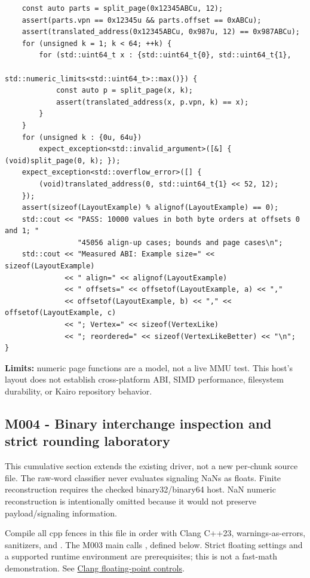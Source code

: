 \begin{verbatim}
    const auto parts = split_page(0x12345ABCu, 12);
    assert(parts.vpn == 0x12345u && parts.offset == 0xABCu);
    assert(translated_address(0x12345ABCu, 0x987u, 12) == 0x987ABCu);
    for (unsigned k = 1; k < 64; ++k) {
        for (std::uint64_t x : {std::uint64_t{0}, std::uint64_t{1},
                                std::numeric_limits<std::uint64_t>::max()}) {
            const auto p = split_page(x, k);
            assert(translated_address(x, p.vpn, k) == x);
        }
    }
    for (unsigned k : {0u, 64u})
        expect_exception<std::invalid_argument>([&] { (void)split_page(0, k); });
    expect_exception<std::overflow_error>([] {
        (void)translated_address(0, std::uint64_t{1} << 52, 12);
    });
    assert(sizeof(LayoutExample) % alignof(LayoutExample) == 0);
    std::cout << "PASS: 10000 values in both byte orders at offsets 0 and 1; "
                 "45056 align-up cases; bounds and page cases\n";
    std::cout << "Measured ABI: Example size=" << sizeof(LayoutExample)
              << " align=" << alignof(LayoutExample)
              << " offsets=" << offsetof(LayoutExample, a) << ","
              << offsetof(LayoutExample, b) << "," << offsetof(LayoutExample, c)
              << "; Vertex=" << sizeof(VertexLike)
              << "; reordered=" << sizeof(VertexLikeBetter) << "\n";
}
\end{verbatim}

\textbf{Limits:} numeric page functions are a model, not a live MMU test. This host's layout does not establish cross-platform ABI, SIMD performance, filesystem durability, or Kairo repository behavior.

\subsection{M004 - Binary interchange inspection and strict rounding laboratory}\label{appendix-4e2236f53445-m004---binary-interchange-inspection-and-strict-rounding-laboratory}

\hypertarget{appendix-4e2236f53445-m004---binary-interchange-inspection-and-strict-rounding-laboratory}{}

This cumulative section extends the existing driver, not a new per-chunk source file. The raw-word classifier never evaluates signaling NaNs as floats. Finite reconstruction requires the checked binary32/binary64 host. NaN numeric reconstruction is intentionally omitted because it would not preserve payload/signaling information.

Compile all cpp fences in this file in order with Clang C++23, warnings-as-errors, sanitizers, and . The M003 main calls , defined below. Strict floating settings and a supported runtime environment are prerequisites; this is not a fast-math demonstration. See \href{https://clang.llvm.org/docs/UsersManual.html\#controlling-floating-point-behavior}{Clang floating-point controls}.

